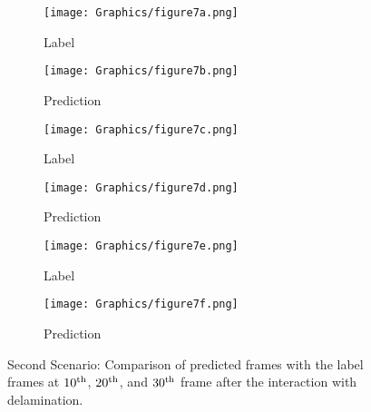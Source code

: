 \begin{figure} []
	\centering
	\begin{subfigure}[b]{0.44\textwidth}
		\centering
		\texttt{[image: Graphics/figure7a.png]}
		\caption{Label}
		\label{fig:num_453_label1}
	\end{subfigure}
	\hfill
	\begin{subfigure}[b]{0.44\textwidth}
		\centering
		\texttt{[image: Graphics/figure7b.png]} 
		\caption{Prediction}
		\label{fig:num_453_pred1}
	\end{subfigure}
	\hfill
	\begin{subfigure}[b]{0.44\textwidth}
		\centering
		\texttt{[image: Graphics/figure7c.png]}
		\caption{Label}
		\label{fig:num_453_label2}
	\end{subfigure}
	\hfill
	\begin{subfigure}[b]{0.44\textwidth}
		\centering
		\texttt{[image: Graphics/figure7d.png]}
		\caption{Prediction}
		\label{fig:num_453_pred2}
	\end{subfigure}
	\hfill
	\begin{subfigure}[b]{0.44\textwidth}
		\centering
		\texttt{[image: Graphics/figure7e.png]}
		\caption{Label}
		\label{fig:num_453_label3}
	\end{subfigure}
	\hfill	
	\begin{subfigure}[b]{0.44\textwidth}
		\centering
		\texttt{[image: Graphics/figure7f.png]}
		\caption{Prediction}
		\label{fig:num_453_pred3}
	\end{subfigure}
	\hfill	
	\caption{Second Scenario: Comparison of predicted frames with the label 
		frames at $10\textsuperscript{th}$, $20\textsuperscript{th}$, and 
		$30\textsuperscript{th}$ frame after the interaction with delamination.}
	\label{fig:num_453}
\end{figure}
